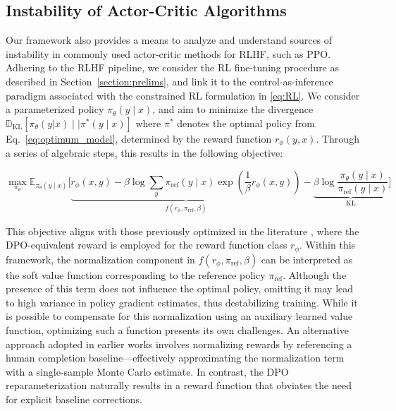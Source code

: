 \subsection{Instability of Actor-Critic Algorithms} Our framework also provides a means to analyze and understand sources of instability in commonly used actor-critic methods for RLHF, such as PPO. Adhering to the RLHF pipeline, we consider the RL fine-tuning procedure as described in Section~\ref{section:prelims}, and link it to the control-as-inference paradigm \cite{levine2018reinforcement} associated with the constrained RL formulation in \ref{eq:RL}. We consider a parameterized policy $\pi_{\theta}(y\mid x)$, and aim to minimize the divergence $\mathbb{D}_{\text{KL}}[\pi_{\theta}(y|x) \mid \mid \pi^*(y\mid x)]$ where $\pi^*$ denotes the optimal policy from Eq.~\ref{eq:optimum_model}, determined by the reward function $r_{\phi}(y, x)$. Through a series of algebraic steps, this results in the following objective:

\begin{equation}\label{eq:AC}
    \max_{\pi_{\theta}}\mathbb{E}_{\pi_{\theta}(y\mid x)}\bigg[\underbrace{r_{\phi}(x, y) -\beta\log\sum_{y}\pi_\text{ref}(y\mid x)\exp\left(\frac{1}{\beta}r_{\phi}(x, y)\right)}_{f(r_{\phi}, \pi_\text{ref}, \beta)} - \underbrace{\beta\log\frac{\pi_{\theta}(y\mid x)}{\pi_\text{ref}(y\mid x)}}_{\text{KL}}\bigg]
\end{equation}

This objective aligns with those previously optimized in the literature \citep{ziegler2020finetuning, stiennon2022learning, bai2022training, ouyang2022training}, where the DPO-equivalent reward is employed for the reward function class $r_{\phi}$. Within this framework, the normalization component in $f(r_{\phi}, \pi_\text{ref}, \beta)$ can be interpreted as the soft value function corresponding to the reference policy $\pi_\text{ref}$. Although the presence of this term does not influence the optimal policy, omitting it may lead to high variance in policy gradient estimates, thus destabilizing training. While it is possible to compensate for this normalization using an auxiliary learned value function, optimizing such a function presents its own challenges. An alternative approach adopted in earlier works involves normalizing rewards by referencing a human completion baseline—effectively approximating the normalization term with a single-sample Monte Carlo estimate. In contrast, the DPO reparameterization naturally results in a reward function that obviates the need for explicit baseline corrections.

